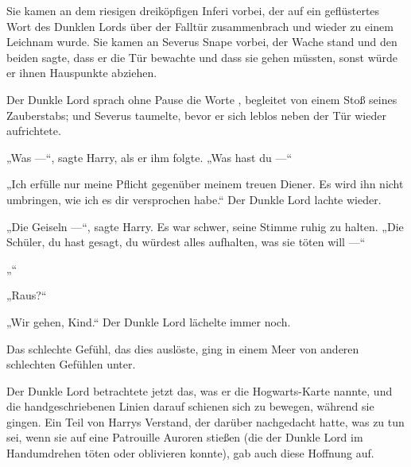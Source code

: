 Sie kamen an dem riesigen dreiköpfigen Inferi vorbei, der auf ein geflüstertes Wort des Dunklen Lords über der Falltür zusammenbrach und wieder zu einem Leichnam wurde.
Sie kamen an Severus Snape vorbei, der Wache stand und den beiden sagte, dass er die Tür bewachte und dass sie gehen müssten, sonst würde er ihnen Hauspunkte abziehen.

Der Dunkle Lord sprach ohne Pause die Worte , begleitet von einem Stoß seines Zauberstabs; und Severus taumelte, bevor er sich leblos neben der Tür wieder aufrichtete.

„Was —“, sagte Harry, als er ihm folgte.
„Was hast du —“

„Ich erfülle nur meine Pflicht gegenüber meinem treuen Diener. Es wird ihn nicht umbringen, wie ich es dir versprochen habe.“
Der Dunkle Lord lachte wieder.

„Die Geiseln —“, sagte Harry.
Es war schwer, seine Stimme ruhig zu halten.
„Die Schüler, du hast gesagt, du würdest alles aufhalten, was sie töten will —“

„“

„Raus?“

„Wir gehen, Kind.“ Der Dunkle Lord lächelte immer noch.

Das schlechte Gefühl, das dies auslöste, ging in einem Meer von anderen schlechten Gefühlen unter.

Der Dunkle Lord betrachtete jetzt das, was er die Hogwarts-Karte nannte, und die handgeschriebenen Linien darauf schienen sich zu bewegen, während sie gingen. Ein Teil von Harrys Verstand, der darüber nachgedacht hatte, was zu tun sei, wenn sie auf eine Patrouille Auroren stießen (die der Dunkle Lord im Handumdrehen töten oder oblivieren konnte), gab auch diese Hoffnung auf.

